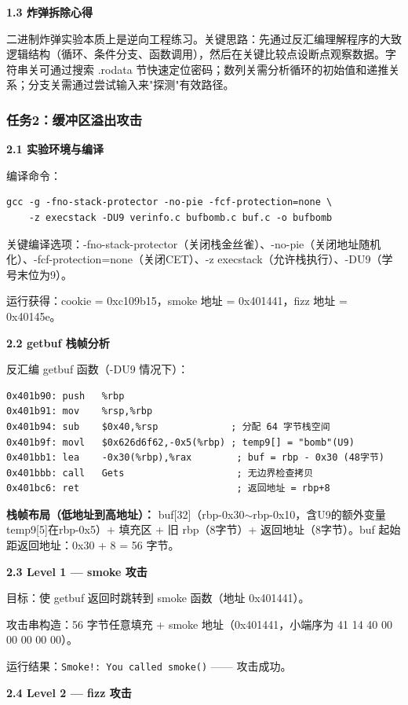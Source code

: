 \textbf{1.3 炸弹拆除心得}

二进制炸弹实验本质上是逆向工程练习。关键思路：先通过反汇编理解程序的大致逻辑结构（循环、条件分支、函数调用），然后在关键比较点设断点观察数据。字符串关可通过搜索 .rodata 节快速定位密码；数列关需分析循环的初始值和递推关系；分支关需通过尝试输入来"探测"有效路径。

\subsubsection*{任务2：缓冲区溢出攻击}

\textbf{2.1 实验环境与编译}

编译命令：
\begin{lstlisting}
gcc -g -fno-stack-protector -no-pie -fcf-protection=none \
    -z execstack -DU9 verinfo.c bufbomb.c buf.c -o bufbomb
\end{lstlisting}

关键编译选项：-fno-stack-protector（关闭栈金丝雀）、-no-pie（关闭地址随机化）、-fcf-protection=none（关闭CET）、-z execstack（允许栈执行）、-DU9（学号末位为9）。

运行获得：cookie = 0xc109b15，smoke 地址 = 0x401441，fizz 地址 = 0x40145e。

\textbf{2.2 getbuf 栈帧分析}

反汇编 getbuf 函数（-DU9 情况下）：

\begin{lstlisting}
0x401b90: push   %rbp
0x401b91: mov    %rsp,%rbp
0x401b94: sub    $0x40,%rsp             ; 分配 64 字节栈空间
0x401b9f: movl   $0x626d6f62,-0x5(%rbp) ; temp9[] = "bomb"(U9)
0x401bb1: lea    -0x30(%rbp),%rax        ; buf = rbp - 0x30 (48字节)
0x401bbb: call   Gets                    ; 无边界检查拷贝
0x401bc6: ret                            ; 返回地址 = rbp+8
\end{lstlisting}

\textbf{栈帧布局（低地址到高地址）：}
buf[32]（rbp-0x30$\sim$rbp-0x10，含U9的额外变量temp9[5]在rbp-0x5）+ 填充区 + 旧 rbp（8字节）+ 返回地址（8字节）。buf 起始距返回地址：0x30 + 8 = 56 字节。

\textbf{2.3 Level 1 — smoke 攻击}

目标：使 getbuf 返回时跳转到 smoke 函数（地址 0x401441）。

攻击串构造：56 字节任意填充 + smoke 地址（0x401441，小端序为 41 14 40 00 00 00 00 00）。

运行结果：\texttt{Smoke!: You called smoke()} —— 攻击成功。

\textbf{2.4 Level 2 — fizz 攻击}

